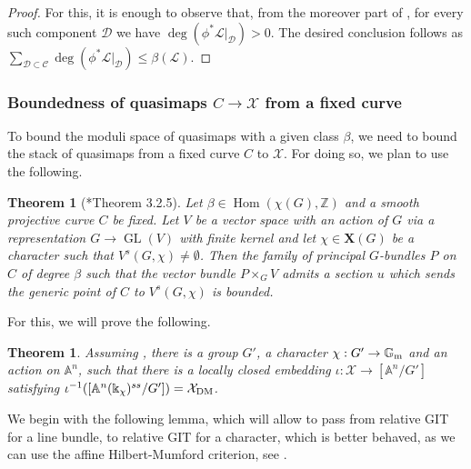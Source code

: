 \documentclass{amsart}
\newcommand{\bA}{\mathbb{A}}
\newcommand{\bG}{\mathbb{G}}
\newcommand{\bZ}{\mathbb{Z}}
\newcommand{\sC}{\mathscr{C}}
\newcommand{\sD}{\mathscr{D}}
\newcommand{\cL}{\mathcal{L}}
\newcommand{\cX}{\mathcal{X}}
\newcommand{\Hom}{\operatorname{Hom}}
\newcommand{\Gm}{\bG_{{\rm m}}}
\newcommand{\GL}{\operatorname{GL}}
\newcommand{\dm}{{\rm DM}}
\newtheorem{Teo}[theorem]{Theorem}
\theoremstyle{definition}
\theoremstyle{definition}
\begin{document}
{\begin{proof}
    For this, it is enough to observe that, from the moreover part of , for every such component $\sD$ we have $\deg(\phi^*\cL|_\sD)>0$. The desired conclusion follows as $\sum_{\sD\subset \sC} \deg(\phi^*\cL|_\sD) \leq \beta(\cL)$. 
\end{proof}

\subsubsection{Boundedness of quasimaps $C\to \cX$ from a fixed curve}
To bound the moduli space of quasimaps with a given class $\beta$, we need to bound the stack of quasimaps from a fixed curve $C$ to $\cX$. For doing so, we plan to use the following.
\begin{Teo}[\cite{ciocan2014stable}*{Theorem 3.2.5}]
    Let $\beta \in \Hom(\chi(G),\bZ)$  and a smooth projective
curve $C$ be fixed. Let $V$ be a vector space with an action of $G$ via a
representation $G\to \GL(V)$ with finite kernel and let $\chi\in \mathbf{X}(G)$ be
a character such that $V^s(G,\chi)\neq\emptyset$. Then the family of principal $G$-bundles $P$ on $C$ of degree $\beta$ such that the vector bundle $P \times_G V$
admits a section $u$ which sends the generic point of $C$ to $V^s(G,\chi)$ is
bounded.
\end{Teo}
For this, we will prove the following.
\begin{Teo}\label{thm_boundedness_embedding_in_vector_space}
    Assuming , there is a group $G'$, a character $\chi:G'\to \Gm$ and an action on $\bA^n$, such that there is a locally closed embedding $\iota:\cX\to [\bA^n/G']$ satisfying $\iota^{-1}([\bA^n(\Bbbk_\chi)^{ss}/G'])=\cX_\dm$.
\end{Teo}

We begin with the following lemma, which will allow to pass from relative GIT for a line bundle, to relative GIT for a character, which is better behaved, as we can use the affine Hilbert-Mumford criterion, see .

}
\end{document}
